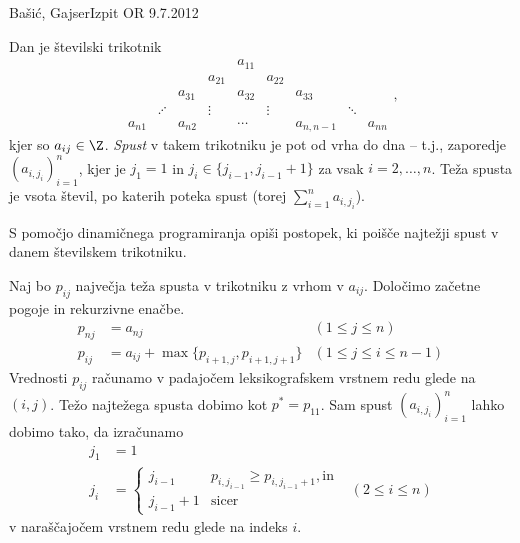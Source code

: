 \begin{naloga}{Bašić, Gajser}{Izpit OR 9.7.2012}
\begin{vprasanje}
Dan je številski trikotnik
$$
\begin{array}{ccccccccc}
                &&&& a_{11} \\
            &&& a_{21} && a_{22} \\
        && a_{31} && a_{32} && a_{33} \\
     & \iddots && \vdots && \vdots && \ddots \\
a_{n1} && a_{n2} && \cdots && a_{n,n-1} && a_{nn}
\end{array} ,
$$
kjer so $a_{ij} \in \Z$.
{\em Spust} v takem trikotniku je pot od vrha do dna
-- t.j., zaporedje $(a_{i, j_i})_{i=1}^n$,
kjer je $j_1 = 1$ in $j_i \in \{j_{i-1}, j_{i-1}+1\}$
za vsak $i = 2, \dots, n$.
Teža spusta je vsota števil, po katerih poteka spust
(torej $\sum_{i=1}^n a_{i, j_i}$).

S pomočjo dinamičnega programiranja opiši postopek,
ki poišče najtežji spust v danem številskem trikotniku.
\end{vprasanje}

\begin{odgovor}
Naj bo $p_{ij}$ največja teža spusta v trikotniku z vrhom v $a_{ij}$.
Določimo začetne pogoje in rekurzivne enačbe.
\begin{align*}
p_{nj} &= a_{nj} & (1 \le j \le n) \\
p_{ij} &= a_{ij} + \max\{p_{i+1,j}, p_{i+1,j+1}\} & (1 \le j \le i \le n-1)
\end{align*}
Vrednosti $p_{ij}$ računamo
v padajočem leksikografskem vrstnem redu glede na $(i, j)$.
Težo najtežega spusta dobimo kot $p^* = p_{11}$.
Sam spust $(a_{i, j_i})_{i=1}^n$ lahko dobimo tako,
da izračunamo
\begin{align*}
j_1 &= 1 \\
j_i &= \begin{cases}
j_{i-1} & p_{i,j_{i-1}} \ge p_{i,j_{i-1}+1}, \text{in} \\
j_{i-1} + 1 & \text{sicer}
\end{cases}
& (2 \le i \le n)
\end{align*}
v naraščajočem vrstnem redu glede na indeks $i$.
\end{odgovor}
\end{naloga}
